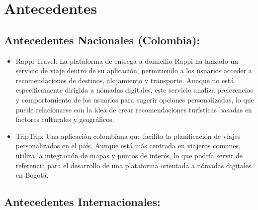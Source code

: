 \section{Antecedentes}

\subsection{Antecedentes Nacionales (Colombia): }

\begin{itemize}
\item Rappi Travel: La plataforma de entrega a domicilio Rappi ha lanzado un servicio de viaje dentro de su aplicación, permitiendo a los usuarios acceder a recomendaciones de destinos, alojamiento y transporte. Aunque no está específicamente dirigida a nómadas digitales, este servicio analiza preferencias y comportamiento de los usuarios para sugerir opciones personalizadas, lo que puede relacionarse con la idea de crear recomendaciones turísticas basadas en factores culturales y geográficos. 

\item TripTrip: Una aplicación colombiana que facilita la planificación de viajes personalizados en el país. Aunque está más centrada en viajeros comunes, utiliza la integración de mapas y puntos de interés, lo que podría servir de referencia para el desarrollo de una plataforma orientada a nómadas digitales en Bogotá. 

\end{itemize}


\subsection{Antecedentes Internacionales:  }

